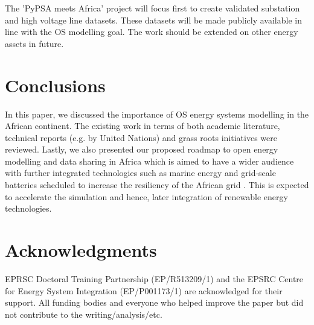\documentclass[conference, a4paper]{IEEEtran}
\begin{document}


The 'PyPSA meets Africa' project will focus first to create validated substation and high voltage line datasets. These datasets will be made publicly available in line with the OS modelling goal. The work should be extended on other energy assets in future.

\section{Conclusions}
In this paper, we discussed the importance of OS energy systems modelling in the African continent. The existing work in terms of both academic literature, technical reports (e.g. by United Nations) and grass roots initiatives were reviewed. Lastly, we also presented our proposed roadmap to open energy modelling and data sharing in Africa which is aimed to have a wider audience with further integrated technologies such as marine energy and grid-scale batteries scheduled to increase the resiliency of the African grid \cite{}. This is expected to accelerate the simulation and hence, later integration of renewable energy technologies.

\section*{Acknowledgments}
EPRSC Doctoral Training Partnership (EP/R513209/1) and the EPSRC Centre for Energy System Integration (EP/P001173/1) are acknowledged for their support.
All funding bodies and everyone who helped improve the paper but did not contribute to the writing/analysis/etc.





\end{document}
